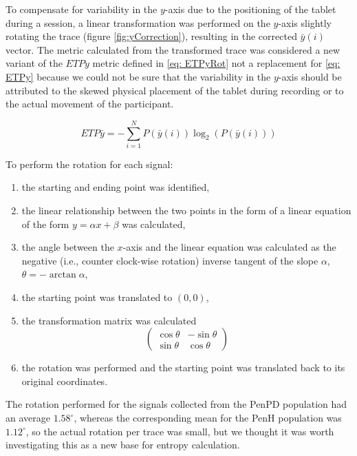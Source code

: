 To compensate for variability in the $y$-axis due to the positioning of the tablet during a session, a linear transformation was performed on the $y$-axis slightly rotating the trace (figure \ref{fig:yCorrection}), resulting in the corrected $\bar{y}(i)$ vector. The metric calculated from the transformed trace was considered a new variant of the $ETPy$ metric defined in \ref{eq: ETPyRot} not a replacement for \ref{eq: ETPy} because we could not be sure that the variability in the $y$-axis should be attributed to the skewed physical placement of the tablet during recording or to the actual movement of the participant. 

\begin{equation} \label{eq: ETPyRot}
ETP\bar{y} = -\sum_{i=1}^{N}P(\bar{y}(i))\log_{2}(P(\bar{y}(i)))
\end{equation}

To perform the rotation for each signal:
\begin{enumerate}
\item the starting and ending point was identified,
\item the linear relationship between the two points in the form of a linear equation of the form $y = {\alpha}x+{\beta}$ was calculated,
\item the angle between the $x$-axis and the linear equation was calculated as the negative (i.e., counter clock-wise rotation) inverse tangent of the slope ${\alpha}$, ${\theta}=-\arctan{\alpha}$,
\item the starting point was translated to $(0,0)$,
\item the transformation matrix was calculated
\begin{equation}
\begin{pmatrix}
\cos{\theta} & -\sin{\theta} \\
\sin{\theta} & \cos{\theta}
\end{pmatrix}
\end{equation}
\item the rotation was performed and the starting point was translated back to its original coordinates. 
\end{enumerate}
The rotation performed for the signals collected from the \gls{PenPD} population had an average $1.58^{\circ}$, whereas the corresponding mean for the \gls{PenH} population was $1.12^{\circ}$, so the actual rotation per trace was small, but we thought it was worth investigating this as a new base for entropy calculation. 

